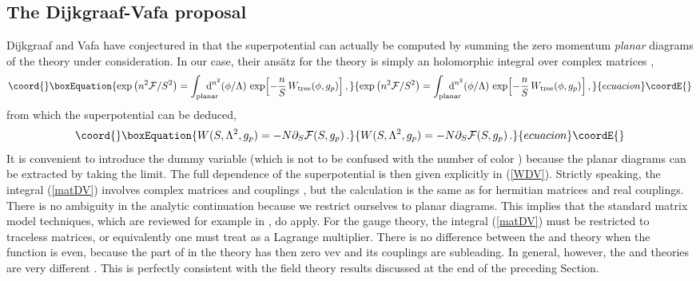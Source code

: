 \documentclass[a4paper,12pt]{article}
\def\d{{\rm d}}
\def\suN{{\rm SU}(N)}
\def\uN{{\rm U}(N)}
\def\wt{W_{\rm tree}}\def\weff{W_{\rm eff}}\def\ww{{\cal W}}
\begin{document}
%
\subsection{The Dijkgraaf-Vafa proposal}
%

Dijkgraaf and Vafa have conjectured in \cite{DV}
that the superpotential \coordHE{}
can actually be computed by summing the zero momentum
{\it planar} diagrams of the \coordHE{} theory under consideration. 
In our case, their ans\"atz for the \myHighlight{$\uN$}\coordHE{} theory
is simply an holomorphic integral over \coordHE{} complex matrices \myHighlight{$\phi$}\coordHE{},
%
\begin{equation}\coord{}\boxEquation{
\label{matDV}
\exp\left( n^{2}\F /S^{2}\right) = \int_{\rm planar}
\hskip -.5cm\d^{n^{2}}(\phi/\L)\,
\exp\Bigl[ -{n\over S}\,\wt (\phi,g_{p})\Bigr]\, ,
}{
\exp\left( n^{2}\F /S^{2}\right) = \int_{\rm planar}
\hskip -.5cm\d^{n^{2}}(\phi/\L)\,
\exp\Bigl[ -{n\over S}\,\wt (\phi,g_{p})\Bigr]\, ,
}{ecuacion}\coordE{}\end{equation}
%
from which the superpotential can be deduced,
%
\begin{equation}\coord{}\boxEquation{
\label{WDV}
W(S,\L^{2},g_{p}) = -N\partial_{S}\F (S,g_{p})\, .
}{
W(S,\L^{2},g_{p}) = -N\partial_{S}\F (S,g_{p})\, .
}{ecuacion}\coordE{}\end{equation}
%
It is convenient to introduce the dummy variable \coordHE{} (which
is not to be confused with the number of color \coordHE{}) because the planar 
diagrams can be extracted by taking the \coordHE{} limit. 
The full \coordHE{} dependence of the superpotential is then given explicitly 
in (\ref{WDV}). Strictly speaking, the integral (\ref{matDV}) involves
complex matrices and couplings \coordHE{}, but the calculation is the same as
for hermitian matrices and real couplings. There is no ambiguity in the 
analytic continuation because we restrict ourselves to
planar diagrams. This implies that the standard matrix model 
techniques, which are reviewed for example in \cite{matrev}, do apply.
For the \myHighlight{$\suN$}\coordHE{} gauge theory, the integral (\ref{matDV})
must be restricted to traceless matrices, or equivalently one must
treat \coordHE{} as a Lagrange multiplier. There is no difference between 
the \myHighlight{$\uN$}\coordHE{} and \myHighlight{$\suN$}\coordHE{} theory when the function \myHighlight{$\wt$}\coordHE{} is even, because 
the \coordHE{} part of \myHighlight{$\phi$}\coordHE{} in the \myHighlight{$\uN$}\coordHE{} theory has then zero vev and 
its couplings are subleading. In general, however, the
\myHighlight{$\uN$}\coordHE{} and \myHighlight{$\suN$}\coordHE{} theories are very different \cite{fer}. This is perfectly 
consistent with the field theory results discussed at the end of the 
preceding Section.
\end{document}
